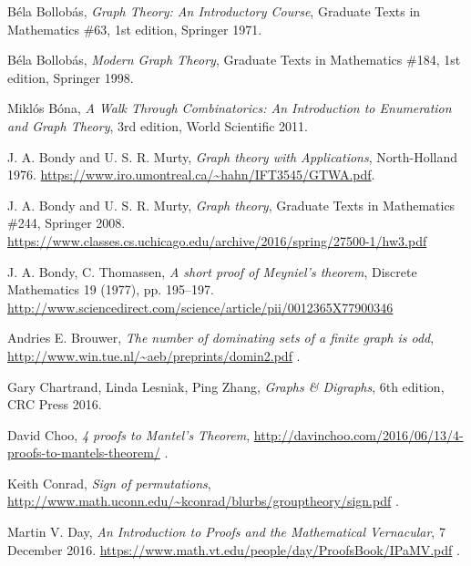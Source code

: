 \documentclass[numbers=enddot,12pt,final,onecolumn,notitlepage]{scrartcl}%
\theoremstyle{definition}
\begin{document}
\begin{thebibliography}{9999999999}
B\'ela Bollob\'as,
\textit{Graph Theory: An Introductory Course},
Graduate Texts in Mathematics \#63, 1st edition, Springer 1971.

B\'ela Bollob\'as,
\textit{Modern Graph Theory},
Graduate Texts in Mathematics \#184, 1st edition, Springer 1998.

Mikl\'os B\'ona,
\textit{A Walk Through Combinatorics:
An Introduction to Enumeration and Graph Theory},
3rd edition, World Scientific 2011.

J. A. Bondy and U. S. R. Murty, \textit{Graph theory with Applications},
North-Holland 1976.
\newline \url{https://www.iro.umontreal.ca/~hahn/IFT3545/GTWA.pdf}.

J. A. Bondy and U. S. R. Murty, \textit{Graph theory}, Graduate Texts
in Mathematics \#244, Springer 2008.
\newline \url{https://www.classes.cs.uchicago.edu/archive/2016/spring/27500-1/hw3.pdf}

J. A. Bondy, C. Thomassen,
\textit{A short proof of Meyniel's theorem},
Discrete Mathematics 19 (1977), pp. 195--197.
\newline \url{http://www.sciencedirect.com/science/article/pii/0012365X77900346}

Andries E. Brouwer,
\textit{The number of dominating sets of a finite graph is odd},
\url{http://www.win.tue.nl/~aeb/preprints/domin2.pdf} .


Gary Chartrand, Linda Lesniak, Ping Zhang,
\textit{Graphs \& Digraphs}, 6th edition, CRC Press 2016.

David Choo,
\textit{4 proofs to Mantel's Theorem},
\url{http://davinchoo.com/2016/06/13/4-proofs-to-mantels-theorem/} .

Keith Conrad, \textit{Sign of permutations},
\newline\url{http://www.math.uconn.edu/~kconrad/blurbs/grouptheory/sign.pdf} .

Martin V. Day,
\textit{An Introduction to Proofs and the Mathematical Vernacular},
7 December 2016.
\newline\url{https://www.math.vt.edu/people/day/ProofsBook/IPaMV.pdf} .


\end{thebibliography}
\end{document}
